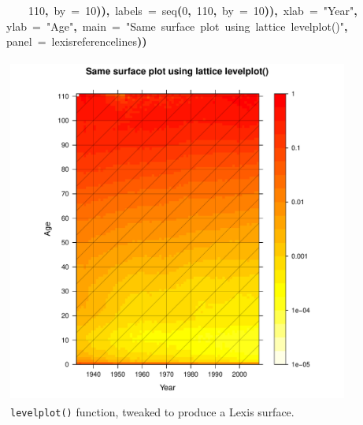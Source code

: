 \documentclass[a4paper]{article}
\newcommand{\hlnumber}[1]{\textcolor[rgb]{0.0823529411764706,0.0784313725490196,0.709803921568627}{#1}}%
\newcommand{\hlfunctioncall}[1]{\textcolor[rgb]{1,0,0}{#1}}%
\newcommand{\hlstring}[1]{\textcolor[rgb]{0.6,0.6,1}{#1}}%
\newcommand{\hlkeyword}[1]{\textcolor[rgb]{0,0,0}{\textbf{#1}}}%
\newcommand{\hlargument}[1]{\textcolor[rgb]{0.694117647058824,0.247058823529412,0.0196078431372549}{#1}}%
\newcommand{\hlsymbol}[1]{\textcolor[rgb]{0,0,0}{#1}}%
\newcommand{\hlprompt}[1]{\textcolor[rgb]{0,0,0}{#1}}%
\newcommand{\hlstd}[1]{\textcolor[rgb]{0,0,0}{#1}}%
\newenvironment{Houtput}{\raggedright}{%
%
}
\begin{document}
\begin{Houtput}
\hlstd{}\hlprompt{{\ }}{\ }{\ }{\ }{\ }{\ }{\ }{\ }{\ }\hlnumber{110}\hlkeyword{,}{\ }\hlargument{by}{\ }\hlargument{=}{\ }\hlnumber{10}\hlkeyword{)}\hlkeyword{)}\hlkeyword{,}{\ }\hlargument{labels}{\ }\hlargument{=}{\ }\hlfunctioncall{seq}\hlkeyword{(}\hlnumber{0}\hlkeyword{,}{\ }\hlnumber{110}\hlkeyword{,}{\ }\hlargument{by}{\ }\hlargument{=}{\ }\hlnumber{10}\hlkeyword{)}\hlkeyword{)}\hlkeyword{,}{\ }\hlargument{xlab}{\ }\hlargument{=}{\ }\hlstring{"Year"}\hlkeyword{,}\hspace*{\fill}\\
\hlstd{}\hlprompt{{\ }}{\ }{\ }{\ }{\ }\hlargument{ylab}{\ }\hlargument{=}{\ }\hlstring{"Age"}\hlkeyword{,}{\ }\hlargument{main}{\ }\hlargument{=}{\ }\hlstring{"Same{\ }surface{\ }plot{\ }using{\ }lattice{\ }levelplot()"}\hlkeyword{,}\hspace*{\fill}\\
\hlstd{}\hlprompt{{\ }}{\ }{\ }{\ }{\ }\hlargument{panel}{\ }\hlargument{=}{\ }\hlsymbol{lexisreferencelines}\hlkeyword{)}\hlkeyword{)}\mbox{}
\normalfont
\hspace*{\fill}\\
\hlstd{}
\end{Houtput}



\begin{figure}[H]
\centering
\includegraphics[width=4.5in,height=4.5in]{figs/latticegood.pdf}
\caption{\texttt{levelplot()} function, tweaked to produce a Lexis surface.}
\end{figure}
\end{document}
